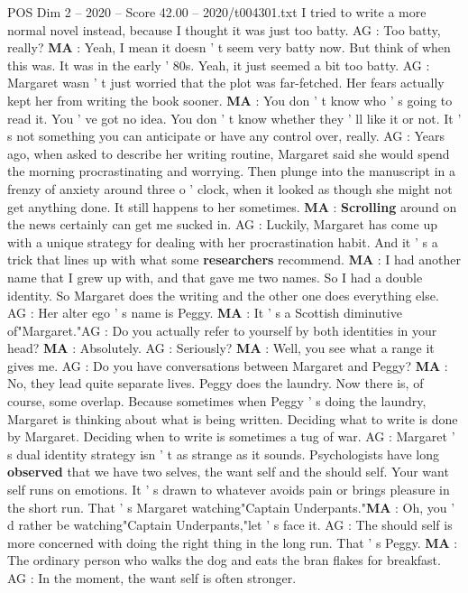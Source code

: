 \begin{textsample}{POS Dim 2 – 2020 – Score 42.00 – 2020/t004301.txt}
I tried to write a more normal novel instead, because I thought it was just too batty.
AG : Too batty, really? \textbf{MA} : Yeah, I mean it doesn ' t seem very batty now.
But think of when this was.
It was in the early ' 80s.
Yeah, it just seemed a bit too batty.
AG : Margaret wasn ' t just worried that the plot was far-fetched.
Her fears actually kept her from writing the book sooner. \textbf{MA} : You don ' t know who ' s going to read it.
You ' ve got no idea.
You don ' t know whether they ' ll like it or not.
It ' s not something you can anticipate or have any control over, really.
AG : Years ago, when asked to describe her writing routine, Margaret said she would spend the morning procrastinating and worrying.
Then plunge into the manuscript in a frenzy of anxiety around three o ' clock, when it looked as though she might not get anything done.
It still happens to her sometimes. \textbf{MA} : \textbf{Scrolling} around on the news certainly can get me sucked in.
AG : Luckily, Margaret has come up with a unique strategy for dealing with her procrastination habit.
And it ' s a trick that lines up with what some \textbf{researchers} recommend. \textbf{MA} : I had another name that I grew up with, and that gave me two names.
So I had a double identity.
So Margaret does the writing and the other one does everything else.
AG : Her alter ego ' s name is Peggy. \textbf{MA} : It ' s a Scottish diminutive of"Margaret."AG : Do you actually refer to yourself by both identities in your head? \textbf{MA} : Absolutely.
AG : Seriously? \textbf{MA} : Well, you see what a range it gives me.
AG : Do you have conversations between Margaret and Peggy? \textbf{MA} : No, they lead quite separate lives.
Peggy does the laundry.
Now there is, of course, some overlap.
Because sometimes when Peggy ' s doing the laundry, Margaret is thinking about what is being written.
Deciding what to write is done by Margaret.
Deciding when to write is sometimes a tug of war.
AG : Margaret ' s dual identity strategy isn ' t as strange as it sounds.
Psychologists have long \textbf{observed} that we have two selves, the want self and the should self.
Your want self runs on emotions.
It ' s drawn to whatever avoids pain or brings pleasure in the short run.
That ' s Margaret watching"Captain Underpants."\textbf{MA} : Oh, you ' d rather be watching"Captain Underpants,"let ' s face it.
AG : The should self is more concerned with doing the right thing in the long run.
That ' s Peggy. \textbf{MA} : The ordinary person who walks the dog and eats the bran flakes for breakfast.
AG : In the moment, the want self is often stronger.

\end{textsample}
